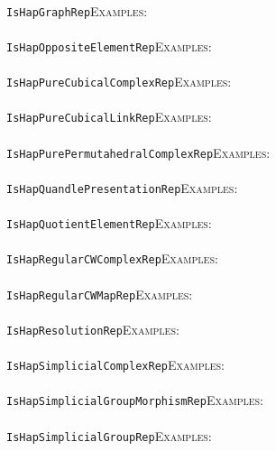 \documentclass[a4paper,11pt]{report}
\begin{document}
{{ \\
 \texttt{IsHapGraphRep}{\nobreakspace}{\nobreakspace}{\nobreakspace}{\nobreakspace}\textsc{Examples:} \\
 \\
 \texttt{IsHapOppositeElementRep}{\nobreakspace}{\nobreakspace}{\nobreakspace}{\nobreakspace}\textsc{Examples:} \\
 \\
 \texttt{IsHapPureCubicalComplexRep}{\nobreakspace}{\nobreakspace}{\nobreakspace}{\nobreakspace}\textsc{Examples:} \\
 \\
 \texttt{IsHapPureCubicalLinkRep}{\nobreakspace}{\nobreakspace}{\nobreakspace}{\nobreakspace}\textsc{Examples:} \\
 \\
 \texttt{IsHapPurePermutahedralComplexRep}{\nobreakspace}{\nobreakspace}{\nobreakspace}{\nobreakspace}\textsc{Examples:} \\
 \\
 \texttt{IsHapQuandlePresentationRep}{\nobreakspace}{\nobreakspace}{\nobreakspace}{\nobreakspace}\textsc{Examples:} \\
 \\
 \texttt{IsHapQuotientElementRep}{\nobreakspace}{\nobreakspace}{\nobreakspace}{\nobreakspace}\textsc{Examples:} \\
 \\
 \texttt{IsHapRegularCWComplexRep}{\nobreakspace}{\nobreakspace}{\nobreakspace}{\nobreakspace}\textsc{Examples:} \\
 \\
 \texttt{IsHapRegularCWMapRep}{\nobreakspace}{\nobreakspace}{\nobreakspace}{\nobreakspace}\textsc{Examples:} \\
 \\
 \texttt{IsHapResolutionRep}{\nobreakspace}{\nobreakspace}{\nobreakspace}{\nobreakspace}\textsc{Examples:} \\
 \\
 \texttt{IsHapSimplicialComplexRep}{\nobreakspace}{\nobreakspace}{\nobreakspace}{\nobreakspace}\textsc{Examples:} \\
 \\
 \texttt{IsHapSimplicialGroupMorphismRep}{\nobreakspace}{\nobreakspace}{\nobreakspace}{\nobreakspace}\textsc{Examples:} \\
 \\
 \texttt{IsHapSimplicialGroupRep}{\nobreakspace}{\nobreakspace}{\nobreakspace}{\nobreakspace}\textsc{Examples:} \\
 \\
}}
\end{document}
